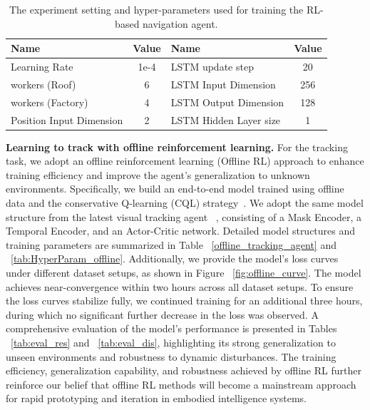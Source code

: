 \begin{table}[ht]
    \centering
     \caption{The experiment setting and hyper-parameters used for training the RL-based navigation agent.}
   \begin{tabular}{l|c|l|c}
\hline\hline
Name & Value &Name & Value \\ \hline
Learning Rate   & 1e-4 &LSTM update step & 20 \\ \hline
workers (Roof)   & 6 &LSTM Input Dimension& 256 \\ \hline
workers (Factory)  & 4 &LSTM Output Dimension& 128\\ \hline
 Position Input Dimension & 2 &LSTM Hidden Layer size & 1 \\ \hline
 
\end{tabular}
   
    \label{tab:HyperParam_nav}
\end{table}


\textbf{Learning to track with offline reinforcement learning.} For the tracking task, we adopt an offline reinforcement learning (Offline RL) approach to enhance training efficiency and improve the agent's generalization to unknown environments. Specifically, we build an end-to-end model trained using offline data and the conservative Q-learning (CQL) strategy~\citep{kumar2020conservative}. We adopt the same model structure from the latest visual tracking agent ~\citep{zhong2024empowering}, consisting of a Mask Encoder, a Temporal Encoder, and an Actor-Critic network. Detailed model structures and training parameters are summarized in Table ~\ref{offline_tracking_agent} and ~\ref{tab:HyperParam_offline}. Additionally, we provide the model's loss curves under different dataset setups, as shown in Figure ~\ref{fig:offline_curve}.
The model achieves near-convergence within two hours across all dataset setups. To ensure the loss curves stabilize fully, we continued training for an additional three hours, during which no significant further decrease in the loss was observed. A comprehensive evaluation of the model's performance is presented in Tables ~\ref{tab:eval_res} and ~\ref{tab:eval_dis}, highlighting its strong generalization to unseen environments and robustness to dynamic disturbances. The training efficiency, generalization capability, and robustness achieved by offline RL further reinforce our belief that offline RL methods will become a mainstream approach for rapid prototyping and iteration in embodied intelligence systems.

